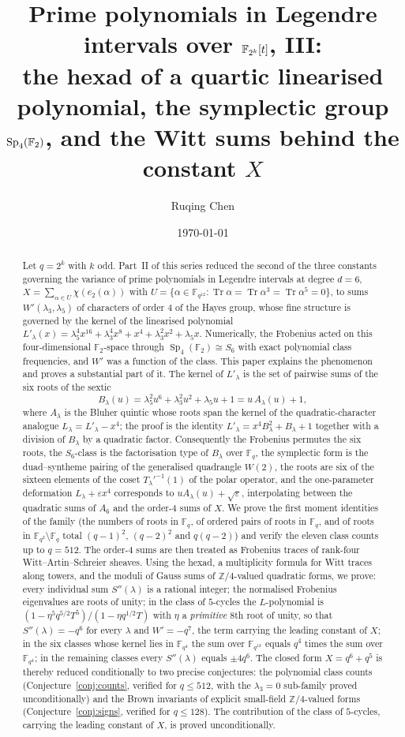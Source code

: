\documentclass[12pt,a4paper]{amsart}
\title[Legendre intervals in even characteristic, III]{Prime polynomials in Legendre intervals over \texorpdfstring{$\F_{2^k}[t]$}{F(2k)[t]}, III:\texorpdfstring{\\}{ }the hexad of a quartic linearised polynomial, the symplectic group \texorpdfstring{$\Sp_4(\F_2)$}{Sp4(F2)}, and the Witt sums behind the constant \texorpdfstring{$X$}{X}}
\author{Ruqing Chen}
\date{\today}
\theoremstyle{definition}
\newcommand{\F}{\mathbb{F}}
\newcommand{\Z}{\mathbb{Z}}
\newcommand{\Tr}{\operatorname{Tr}}
\newcommand{\Sp}{\operatorname{Sp}}
\newcommand{\eps}{\varepsilon}
\newcommand{\Spp}{S''}
\begin{document}
\begin{abstract}
Let $q=2^k$ with $k$ odd. Part~II of this series reduced the second of the three constants governing the variance of prime polynomials in Legendre intervals at degree $d=6$, $X=\sum_{\alpha\in U}\chi(e_2(\alpha))$ with $U=\{\alpha\in\F_{q^{12}}:\Tr\alpha=\Tr\alpha^3=\Tr\alpha^5=0\}$, to sums $W'(\lambda_3,\lambda_5)$ of characters of order $4$ of the Hayes group, whose fine structure is governed by the kernel of the linearised polynomial $L'_\lambda(x)=\lambda_5^4x^{16}+\lambda_3^4x^8+x^4+\lambda_3^2x^2+\lambda_5x$. Numerically, the Frobenius acted on this four-dimensional $\F_2$-space through $\Sp_4(\F_2)\cong S_6$ with exact polynomial class frequencies, and $W'$ was a function of the class. This paper explains the phenomenon and proves a substantial part of it. The kernel of $L'_\lambda$ is the set of pairwise sums of the six roots of the sextic
\[
B_\lambda(u)=\lambda_5^2u^6+\lambda_3^2u^2+\lambda_5u+1=u\,A_\lambda(u)+1,
\]
where $A_\lambda$ is the Bluher quintic whose roots span the kernel of the quadratic-character analogue $L_\lambda=L'_\lambda-x^4$; the proof is the identity $L'_\lambda=x^4B_\lambda^2+B_\lambda+1$ together with a division of $B_\lambda$ by a quadratic factor. Consequently the Frobenius permutes the six roots, the $S_6$-class is the factorisation type of $B_\lambda$ over $\F_q$, the symplectic form is the duad--syntheme pairing of the generalised quadrangle $W(2)$, the roots are six of the sixteen elements of the coset $T_\lambda'^{-1}(1)$ of the polar operator, and the one-parameter deformation $L_\lambda+\eps x^4$ corresponds to $uA_\lambda(u)+\sqrt\eps$, interpolating between the quadratic sums of $A_6$ and the order-$4$ sums of $X$. We prove the first moment identities of the family (the numbers of roots in $\F_q$, of ordered pairs of roots in $\F_q$, and of roots in $\F_{q^2}\setminus\F_q$ total $(q-1)^2$, $(q-2)^2$ and $q(q-2)$) and verify the eleven class counts up to $q=512$. The order-$4$ sums are then treated as Frobenius traces of rank-four Witt--Artin--Schreier sheaves. Using the hexad, a multiplicity formula for Witt traces along towers, and the moduli of Gauss sums of $\Z/4$-valued quadratic forms, we prove: every individual sum $\Spp(\lambda)$ is a rational integer; the normalised Frobenius eigenvalues are roots of unity; in the class of $5$-cycles the $L$-polynomial is $(1-\eta^5q^{5/2}T^5)/(1-\eta q^{1/2}T)$ with $\eta$ a \emph{primitive} $8$th root of unity, so that $\Spp(\lambda)=-q^6$ for every $\lambda$ and $W'=-q^7$, the term carrying the leading constant of $X$; in the six classes whose kernel lies in $\F_{q^4}$ the sum over $\F_{q^{12}}$ equals $q^4$ times the sum over $\F_{q^4}$; in the remaining classes every $\Spp(\lambda)$ equals $\pm4q^6$. The closed form $X=q^6+q^5$ is thereby reduced conditionally to two precise conjectures: the polynomial class counts (Conjecture~\ref{conj:counts}, verified for $q\le512$, with the $\lambda_3=0$ sub-family proved unconditionally) and the Brown invariants of explicit small-field $\Z/4$-valued forms (Conjecture~\ref{conj:signs}, verified for $q\le128$). The contribution of the class of $5$-cycles, carrying the leading constant of $X$, is proved unconditionally.
\end{abstract}
\end{document}

